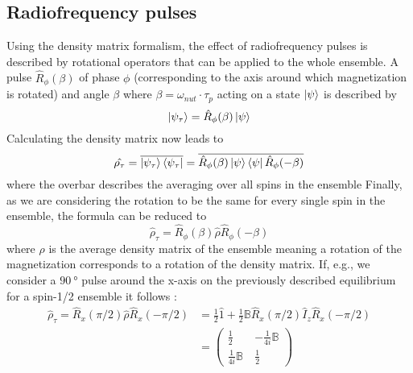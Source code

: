        \subsection{Radiofrequency pulses}
        \label{sec:theory:RFPulses}
            Using the density matrix formalism, the effect of radiofrequency pulses is described by rotational operators that can be
            applied to the whole ensemble. A pulse $\hat R_\phi(\beta)$ of phase $\phi$ (corresponding
            to the axis around which magnetization is rotated) and angle $\beta$ where
            $\beta=\omega_{nut} \cdot \tau_p$ acting on a state $\ket\psi$ is described by 
            \begin{equation}
                \ket{\psi_\tau}= \hat R_\phi(\beta)\ket\psi
            \end{equation}
            Calculating the density matrix now leads to
            \begin{equation}
                \hat {\rho_\tau} = \overline{\ket{\psi_\tau}\bra{\psi_\tau}} = \overline{\hat
                    R_{\phi}(\beta)\ket\psi\bra\psi \hat R_\phi(-\beta)}
            \end{equation}
            where the overbar describes the averaging over all spins in the ensemble \cite{popov_modern_1990, chizhik_magnetic_2014} Finally, as we are considering the rotation to be the same for every single spin in the ensemble, the formula can be reduced to
            \begin{equation}
                \hat\rho_\tau = \hat R_\phi(\beta) \hat \rho \hat R_\phi(-\beta)
            \end{equation}
            where $\rho$ is the average density matrix of the ensemble meaning a rotation of the magnetization corresponds to a rotation of the density matrix. If, e.g., we consider a $\SI{90}{\degree}$ pulse around the x-axis on the previously described equilibrium for a spin-1/2 ensemble it follows \cite{hosur_scaling_1990, levitt_spin_nodate}:
            \begin{equation}
                \begin{split}
                    \hat\rho_\tau = \hat R_x(\pi/2)\hat\rho\hat R_x(-\pi/2) &= \frac{1}{2} \hat 1 +
                    \frac{1}{2} \mathbb{B}\hat R_x(\pi/2) \hat I_z \hat R_x(-\pi/2)\\
                    &=
                    \begin{pmatrix}
                        \frac{1}{2} & -\frac{1}{4i}\mathbb{B}\\
                        \frac{1}{4i}\mathbb{B}\ & \frac{1}{2}
                    \end{pmatrix}
                \end{split}
            \end{equation}
